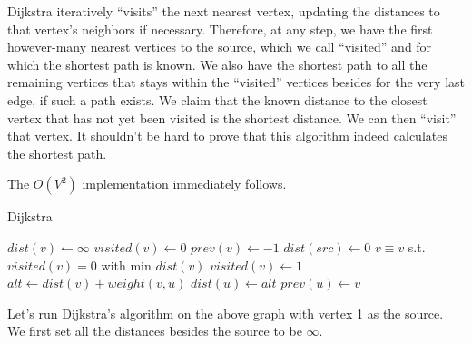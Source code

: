 Dijkstra iteratively ``visits'' the next nearest vertex, updating the distances to that vertex's neighbors if necessary. Therefore, at any step, we have the first however-many nearest vertices to the source, which we call ``visited'' and for which the shortest path is known. We also have the shortest path to all the remaining vertices that stays within the ``visited'' vertices besides for the very last edge, if such a path exists. We claim that the known distance to the closest vertex that has not yet been visited is the shortest distance. We can then ``visit'' that vertex. It shouldn't be hard to prove that this algorithm indeed calculates the shortest path.

The $O(V^2)$ implementation immediately follows.

\begin{algorithm}[H]
\caption{Dijkstra}
\begin{algorithmic}
	\State $dist(v) \gets \infty$
	\State $visited(v) \gets 0$
    \State $prev(v) \gets -1$
\EndFor
\State $dist(src) \gets 0$
	\State $v \equiv v$ s.t. $visited(v)=0$ with min $dist(v)$
    \State $visited(v) \gets 1$
    		\State $alt \gets dist(v) + weight(v, u)$
				\State $dist(u) \gets alt$
   	        	\State $prev(u) \gets v$
			\EndIf
        \EndIf
    \EndFor
\EndWhile
\end{algorithmic}
\end{algorithm}

\begin{center}
\end{center}

Let's run Dijkstra's algorithm on the above graph with vertex 1 as the source. We first set all the distances besides the source to be $\infty$.

